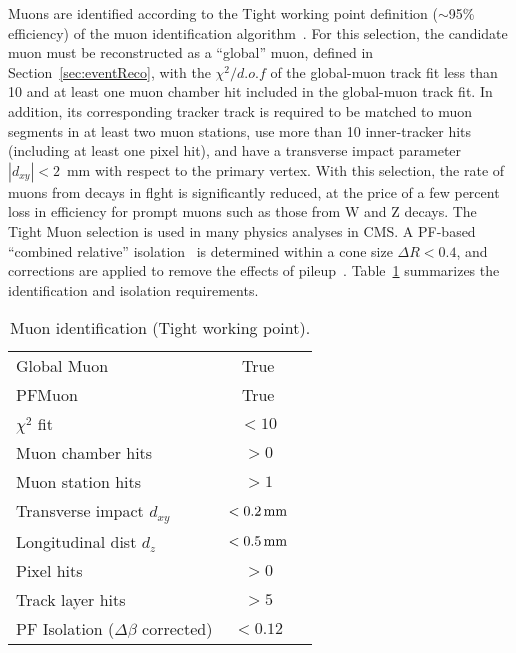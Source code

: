 Muons are identified according to the Tight working point definition
($\sim$95\% efficiency) of the muon identification algorithm~\cite{ref:muon-id}. 
For this selection, the candidate muon must be reconstructed as a ``global'' muon, 
defined in Section~\ref{sec:eventReco}, with the $\chi^2/d.o.f$ of the global-muon 
track fit less than 10 and at least one muon chamber hit included in the global-muon 
track fit. In addition, its corresponding tracker track is required to be matched to muon 
segments in at least two muon stations, use more than 10 inner-tracker hits (including at least one
pixel hit), and have a transverse impact parameter $|d_{xy}| < 2$~mm with respect to
the primary vertex. With this selection, the rate of muons from decays in flght is
significantly reduced, at the price of a few percent loss in efficiency for
prompt muons such as those from W and Z decays. The Tight Muon selection is used in many 
physics analyses in CMS. A PF-based ``combined relative'' isolation~\cite{ref:muon-id} is determined 
within a cone size $\Delta R < 0.4$, and corrections are applied to remove the effects of 
pileup~\cite{CMS-PAS-PFT-10-003}. Table~\ref{tab:muon-id} summarizes the identification 
and isolation requirements. 

\begin{table}[h!]
  \caption{Muon identification (Tight working point).\label{tab:muon-id}}
  \centering
  \footnotesize
  \begin{tabular}{ lcc }
    \hline
    \hline
    Global Muon                            & True       \\        
    PFMuon                                 & True       \\
    $\chi^{2}$ fit                         & $<10$      \\
    Muon chamber hits                      & $>0$       \\
    Muon station hits                      & $>1$       \\
    Transverse impact $d_{xy}$             & $<0.2\,\text{mm}$  \\
    Longitudinal dist $d_{z}$              & $<0.5\,\text{mm}$  \\
    Pixel hits                             & $>0$       \\
    Track layer hits                       & $>5$       \\
    PF Isolation ($\Delta\beta$ corrected) & $<0.12$    \\
    \hline
    \hline
  \end{tabular}
\end{table}

